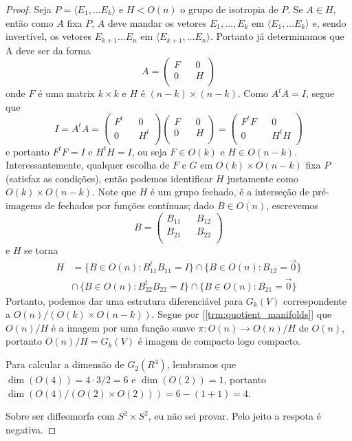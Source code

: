 \begin{proof}
    Seja $P = \langle E_1, \dots E_k \rangle$ e $H < O(n)$ o grupo de isotropia de $P$. Se $A \in H$, então como $A$ fixa $P$,
    $A$ deve mandar os vetores $E_1, \dots, E_k$ em $\langle E_1, \dots E_k \rangle$ e, sendo invertível, os vetores $E_{k+1} \dots E_{n}$
    em $\langle E_{k+1}, \dots E_n \rangle$. Portanto já determinamos que A deve ser da forma 
    $$A = \begin{pmatrix}
        F && 0\\
        0 && H \\
    \end{pmatrix}$$
    onde $F$ é uma matrix $k\times k$ e $H$ é $(n-k)\times(n-k)$. Como $A^tA = I$,
    segue que 
    $$I = A^tA = \begin{pmatrix}
        F^t && 0\\
        0 && H^t \\
    \end{pmatrix}
    \begin{pmatrix}
        F && 0\\
        0 && H \\
    \end{pmatrix}
    =
    \begin{pmatrix}
        F^tF && 0\\
        0 && H^tH\\
    \end{pmatrix}
    $$
    e portanto $F^tF = I$ e $H^tH = I$, ou seja $F \in O(k)$ e $H \in O(n-k)$. Interessantemente, qualquer escolha 
    de $F$ e $G$ em $O(k) \times O(n-k)$ fixa $P$ (satisfaz as condições), então podemos identificar $H$ justamente como $O(k)\times O(n-k)$.
    Note que $H$ é um grupo fechado, é a interseção de pré-imagems de fechados por funções contínuas; dado $B \in O(n)$,
    escrevemos 
    $$B = \begin{pmatrix}
        B_{11} && B_{12}\\
        B_{21} && B_{22}\\
    \end{pmatrix}$$
    e $H$ se torna 
    \begin{align*}
        H &= \{B \in O(n) : B_{11}^tB_{11} = I\} \cap \{B \in O(n) : B_{12} = \vec{0}\}\\ 
        & \cap \,\{B \in O(n) : B_{22}^tB_{22} = I\} \cap \{B \in O(n) : B_{21} = \vec{0}\}
    \end{align*}
    Portanto, podemos dar uma estrutura diferenciável para $G_k(V)$ correspondente a $O(n)/(O(k)\times O(n-k))$.
    Segue por [\ref{trm:quotient_manifolds}] que $O(n)/H$ é a imagem 
    por uma função suave $\pi : O(n) \to O(n)/H$ de $O(n)$, portanto $O(n)/H = G_k(V)$ é imagem de compacto logo compacto.
    
    
    Para calcular a dimensão de $G_2(R^4)$, lembramos que $\dim(O(4)) = 4\cdot3/2 = 6$ e $\dim(O(2)) = 1$, 
    portanto $\dim(O(4)/(O(2) \times O(2))) = 6 - (1 + 1) = 4$. 

    Sobre ser diffeomorfa com $S^2 \times S^2$, eu não sei provar. Pelo jeito a respota é negativa.
\end{proof}

